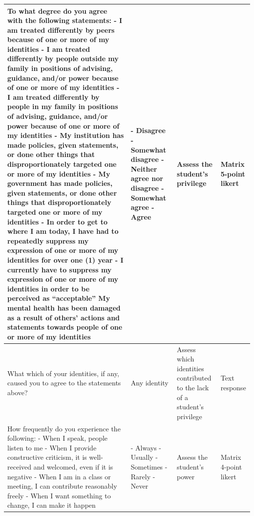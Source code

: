 \documentclass[10pt, twocolumn]{article}
\begin{document}
\begin{xltabular}{\textwidth}{|p{0.3\textwidth}|p{0.3\textwidth}|p{0.2\textwidth}|X|}
    To what degree do you agree with the following statements: \newline - I am treated differently by peers because of one or more of my identities \newline - I am treated differently by people outside my family in positions of advising, guidance, and/or power because of one or more of my identities \newline - I am treated differently by people in my family in positions of advising, guidance, and/or power because of one or more of my identities \newline - My institution has made policies, given statements, or done other things that disproportionately targeted one or more of my identities \newline - My government has made policies, given statements, or done other things that disproportionately targeted one or more of my identities \newline - In order to get to where I am today, I have had to repeatedly suppress my expression of one or more of my identities for over one (1) year \newline - I currently have to suppress my expression of one or more of my identities in order to be perceived as ``acceptable'' \newline My mental health has been damaged as a result of others' actions and statements towards people of one or more of my identities & - Disagree \newline - Somewhat disagree \newline - Neither agree nor disagree \newline - Somewhat agree \newline - Agree & Assess the student's privilege & Matrix 5-point likert \\ \hline
    What which of your identities, if any, caused you to agree to the statements above? & Any identity & Assess which identities contributed to the lack of a student's privilege & Text response \\
    \hline
    How frequently do you experience the following:  \newline - When I speak, people listen to me \newline - When I provide constructive criticism, it is well-received and welcomed, even if it is negative \newline - When I am in a class or meeting, I can contribute reasonably freely \newline - When I want something to change, I can make it happen & - Always \newline - Usually \newline - Sometimes \newline - Rarely \newline - Never & Assess the student's power & Matrix 4-point likert \\

\end{xltabular}
\end{document}
